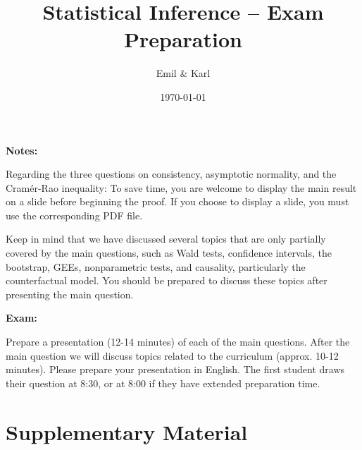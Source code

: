 \documentclass[a4paper,oneside,article,english]{memoir}
\title{Statistical Inference -- Exam Preparation}
\author{Emil \& Karl}
\date{\today}
\begin{document}
\maketitle
\tableofcontents*
\bigskip

\noindent\textbf{Notes:}

Regarding the three questions on consistency, asymptotic normality, and the Cramér-Rao
inequality: To save time, you are welcome to display the main result on a slide before
beginning the proof. If you choose to display a slide, you must use the corresponding
PDF file.
\bigskip

Keep in mind that we have discussed several topics that are only partially covered by the main
questions, such as Wald tests, confidence intervals, the bootstrap, GEEs, nonparametric tests, and
causality, particularly the counterfactual model. You should be prepared to discuss these topics
after presenting the main question.
\bigskip

\noindent\textbf{Exam:}

Prepare a presentation (12-14 minutes) of each of the main questions. After the main
question we will discuss topics related to the curriculum (approx. 10-12 minutes). Please prepare
your presentation in English. The first student draws their question at 8:30, or at 8:00 if they
have extended preparation time.
\bigskip












\chapter{Supplementary Material}






\end{document}
